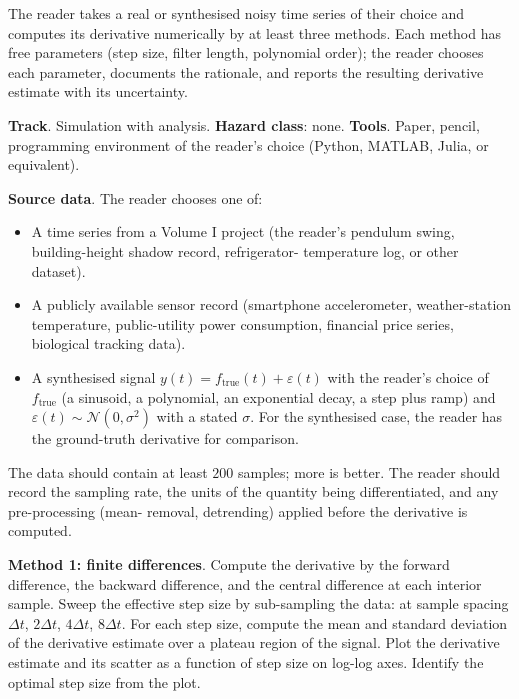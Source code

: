 \begin{project}

The reader takes a real or synthesised noisy time series of their
choice and computes its derivative numerically by at least three
methods. Each method has free parameters (step size, filter
length, polynomial order); the reader chooses each parameter,
documents the rationale, and reports the resulting derivative
estimate with its uncertainty.

\textbf{Track}. Simulation with analysis. \textbf{Hazard class}:
none. \textbf{Tools}. Paper, pencil, programming environment of
the reader's choice (Python, MATLAB, Julia, or equivalent).

\textbf{Source data}. The reader chooses one of:

\begin{itemize}[leftmargin=*]
  \item A time series from a Volume I project (the reader's
    pendulum swing, building-height shadow record, refrigerator-
    temperature log, or other dataset).
  \item A publicly available sensor record (smartphone
    accelerometer, weather-station temperature, public-utility
    power consumption, financial price series, biological tracking
    data).
  \item A synthesised signal $y(t) = f_{\text{true}}(t) +
    \varepsilon(t)$ with the reader's choice of $f_{\text{true}}$
    (a sinusoid, a polynomial, an exponential decay, a step plus
    ramp) and $\varepsilon(t) \sim \mathcal{N}(0, \sigma^{2})$ with
    a stated $\sigma$. For the synthesised case, the reader has the
    ground-truth derivative for comparison.
\end{itemize}

The data should contain at least $200$ samples; more is better.
The reader should record the sampling rate, the units of the
quantity being differentiated, and any pre-processing (mean-
removal, detrending) applied before the derivative is computed.

\textbf{Method 1: finite differences}. Compute the derivative by
the forward difference, the backward difference, and the central
difference at each interior sample. Sweep the effective step size
by sub-sampling the data: at sample spacing $\Delta t$, $2\Delta
t$, $4\Delta t$, $8\Delta t$. For each step size, compute the
mean and standard deviation of the derivative estimate over a
plateau region of the signal. Plot the derivative estimate and
its scatter as a function of step size on log-log axes. Identify
the optimal step size from the plot.


\end{project}
